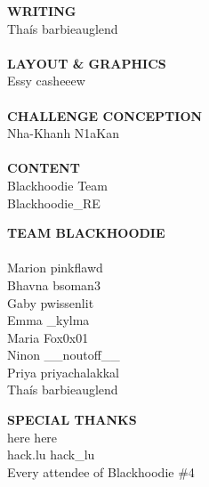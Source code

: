 \begin{multicols}{3}\footnotesize
\setlength{\columnseprule}{0pt}
\begin{center}
\textbf{WRITING}\\
Tha\'is \faTwitter barbieauglend\\
~\\
\textbf{LAYOUT \& GRAPHICS}\\
Essy \faTwitter casheeew\\
~\\
\textbf{CHALLENGE CONCEPTION}\\
Nha-Khanh \faTwitter N1aKan\\
~\\
\textbf{CONTENT}\\
Blackhoodie Team\\
\faTwitter Blackhoodie\_RE\\
\end{center}
\columnbreak
\begin{center}
\textbf{TEAM BLACKHOODIE}\\
~\\
Marion \faTwitter pinkflawd\\
Bhavna \faTwitter bsoman3\\
Gaby \faTwitter pwissenlit\\
Emma \faTwitter \_kylma\\
Maria \faTwitter Fox0x01\\
Ninon \faTwitter \_\_noutoff\_\_\\
Priya \faTwitter priyachalakkal\\
Tha\'is \faTwitter barbieauglend\\
\end{center}
\columnbreak
\begin{center}
\textbf{SPECIAL THANKS}\\
here \faTwitter here\\
hack.lu \faTwitter hack\_lu\\
Every attendee of Blackhoodie \#4
\end{center}
\end{multicols}
\vspace{-6em}
